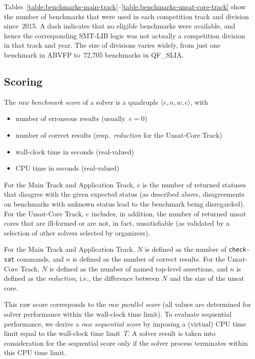 \documentclass[dvipsnames,table,twoside,11pt]{article}
\newcommand{\maintrack}{Main Track\xspace}
\newcommand{\apptrack}{Application Track\xspace}
\newcommand{\ucoretrack}{Unsat-Core Track\xspace}
\begin{document}
Tables~\ref{table:benchmarks-main-track}--\ref{table:benchmarks-unsat-core-track}
show the number of benchmarks that were used in each competition track
and division since~2015.  A dash indicates that no eligible benchmarks
were available, and hence the corresponding SMT-LIB logic was not
actually a competition division in that track and year.  The size of
divisions varies widely, from just one benchmark in ABVFP to~72,705
benchmarks in QF\_SLIA.

\subsection{Scoring}

The \emph{raw benchmark score} of a solver is a quadruple $\langle
e, n, w, c\rangle$, with
\begin{itemize}[noitemsep]
  \item {} number of erroneous results (usually~$e = 0$)
  \item {} number of correct results (resp.~\emph{reduction} for the \ucoretrack)
  \item {} wall-clock time in seconds (real-valued)
  \item {} CPU time in seconds (real-valued)
\end{itemize}
\noindent
For the \maintrack and \apptrack, $e$ is the number of returned statuses that disagree with the given expected status (as described above, disagreements on benchmarks with unknown status lead to the benchmark being disregarded). For the \ucoretrack, $e$ includes, in addition, the number of returned unsat cores that are ill-formed or are not, in fact, unsatisfiable (as validated by a selection of other solvers selected by organizers).

For the \maintrack and \apptrack,
$N$ is defined as the number of {\tt check-sat} commands, and
$n$ is defined as the number of correct results.
For the \ucoretrack, $N$ is defined as the number of named top-level assertions,
and $n$ is defined as the \emph{reduction}, i.e., the difference between $N$
and the size of the unsat core.

This raw score corresponds to the \emph{raw parallel score} (all values are
determined for solver performance within the wall-clock time limit).  To
evaluate sequential performance, we derive a \emph{raw sequential score} by
imposing a (virtual) CPU time limit equal to the wall-clock time limit~$T$.  A
solver result is taken into consideration for the sequential score only if the
solver process terminates within this CPU time limit.
\end{document}
